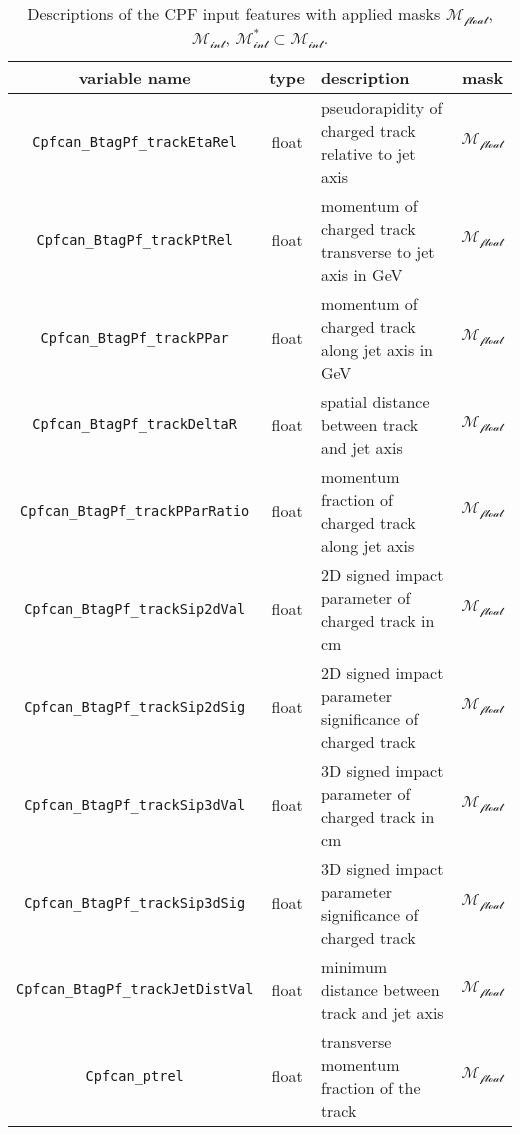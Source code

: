 \begin{table}[h]
\centering
\caption{Descriptions of the CPF input features with applied masks $\mathcal{M_{\text{float}}}$, $\mathcal{M_{\text{int}}}$, $\mathcal{M_{\text{int}}^*\subset M_{\text{int}}}$.}
\begin{tabularx}{\textwidth}{|c|c|X|c|}
\hline
\textbf{variable name} & \textbf{type} & \textbf{description} & \textbf{mask} \\
\hline
\texttt{Cpfcan\_BtagPf\_trackEtaRel} & float & pseudorapidity of charged track relative to jet axis & \cellcolor{green!50}$\mathcal{M_{\text{float}}}$ \\
\hline
\texttt{Cpfcan\_BtagPf\_trackPtRel} & float & momentum of charged track transverse to jet axis in GeV & \cellcolor{green!50}$\mathcal{M_{\text{float}}}$ \\
\hline
\texttt{Cpfcan\_BtagPf\_trackPPar} & float & momentum of charged track along jet axis in GeV & \cellcolor{green!50}$\mathcal{M_{\text{float}}}$ \\
\hline
\texttt{Cpfcan\_BtagPf\_trackDeltaR} & float & spatial distance between track and jet axis & \cellcolor{green!50}$\mathcal{M_{\text{float}}}$ \\
\hline
\texttt{Cpfcan\_BtagPf\_trackPParRatio} & float & momentum fraction of charged track along jet axis & \cellcolor{green!50}$\mathcal{M_{\text{float}}}$ \\
\hline
\texttt{Cpfcan\_BtagPf\_trackSip2dVal} & float & 2D signed impact parameter of charged track in cm & \cellcolor{green!50}$\mathcal{M_{\text{float}}}$ \\
\hline
\texttt{Cpfcan\_BtagPf\_trackSip2dSig} & float & 2D signed impact parameter significance of charged track & \cellcolor{green!50}$\mathcal{M_{\text{float}}}$ \\
\hline
\texttt{Cpfcan\_BtagPf\_trackSip3dVal} & float & 3D signed impact parameter of charged track in cm & \cellcolor{green!50}$\mathcal{M_{\text{float}}}$ \\
\hline
\texttt{Cpfcan\_BtagPf\_trackSip3dSig} & float & 3D signed impact parameter significance of charged track & \cellcolor{green!50}$\mathcal{M_{\text{float}}}$ \\
\hline
\texttt{Cpfcan\_BtagPf\_trackJetDistVal} & float & minimum distance between track and jet axis & \cellcolor{green!50}$\mathcal{M_{\text{float}}}$ \\
\hline
\texttt{Cpfcan\_ptrel} & float & transverse momentum fraction of the track & \cellcolor{green!50}$\mathcal{M_{\text{float}}}$ \\

\end{tabularx}
\end{table}
